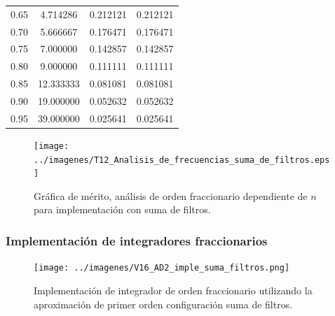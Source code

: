\documentclass[10pt]{beamer}
\begin{document}
\begin{frame}
\begin{minipage}[b]{0.45\textwidth}
\begin{tiny}
\begin{table}[!hbp]
\begin{tabular}{cccc}
			0.65 & 4.714286 & 0.212121 & 0.212121 \\ 
			                                   
			0.70 & 5.666667 & 0.176471 & 0.176471 \\ 
			                                  
			0.75 & 7.000000 & 0.142857 & 0.142857 \\ 
			                                   
			0.80 & 9.000000 & 0.111111 & 0.111111 \\ 
			                                 
			0.85 & 12.333333 & 0.081081 & 0.081081 \\
			                                  
			0.90 & 19.000000 & 0.052632 & 0.052632 \\
			                                  
			0.95 & 39.000000 & 0.025641 & 0.025641 \\
			\hline                                              
			\end{tabular}                                                                
	\end{table}
			\end{tiny}
		\end{minipage} \hfill \begin{minipage}[b]{0.45\textwidth}
			\begin{figure}[hbtp]
		\caption{Gráfica de mérito, análisis de orden fraccionario dependiente de $n$ para implementación con suma de filtros.} 
		\label{fig:T12_Analisis_de_frecuencias_suma_de_filtros}
		\centering
		\texttt{[image: ../imagenes/T12\_Analisis\_de\_frecuencias\_suma\_de\_filtros.eps]}
	\end{figure}
		\end{minipage}
	\end{frame}
	\begin{frame}
		\frametitle{Implementación de integradores fraccionarios}
		\begin{figure}[!ht] 
		\caption{Implementación de integrador de orden fraccionario utilizando la aproximación de primer orden configuración suma de filtros.}
		\label{fig:V16_AD2_imple_suma_filtros}
		\centering
		\texttt{[image: ../imagenes/V16\_AD2\_imple\_suma\_filtros.png]}
	\end{figure}
	\end{frame}
\end{document}
